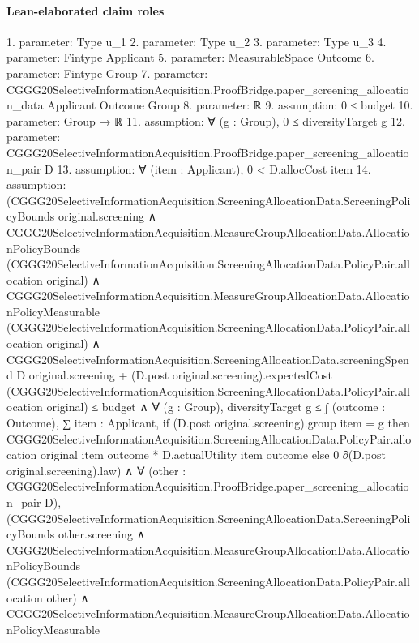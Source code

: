 \documentclass[10pt]{article}
\begin{document}
\paragraph{Lean-elaborated claim roles}\begin{ReviewVerbatim}
1. parameter: Type u_1
2. parameter: Type u_2
3. parameter: Type u_3
4. parameter: Fintype Applicant
5. parameter: MeasurableSpace Outcome
6. parameter: Fintype Group
7. parameter: CGGG20SelectiveInformationAcquisition.ProofBridge.paper_screening_allocation_data Applicant Outcome Group
8. parameter: ℝ
9. assumption: 0 ≤ budget
10. parameter: Group → ℝ
11. assumption: ∀ (g : Group), 0 ≤ diversityTarget g
12. parameter: CGGG20SelectiveInformationAcquisition.ProofBridge.paper_screening_allocation_pair D
13. assumption: ∀ (item : Applicant), 0 < D.allocCost item
14. assumption: (CGGG20SelectiveInformationAcquisition.ScreeningAllocationData.ScreeningPolicyBounds original.screening ∧
    CGGG20SelectiveInformationAcquisition.MeasureGroupAllocationData.AllocationPolicyBounds
        (CGGG20SelectiveInformationAcquisition.ScreeningAllocationData.PolicyPair.allocation original) ∧
      CGGG20SelectiveInformationAcquisition.MeasureGroupAllocationData.AllocationPolicyMeasurable
          (CGGG20SelectiveInformationAcquisition.ScreeningAllocationData.PolicyPair.allocation original) ∧
        CGGG20SelectiveInformationAcquisition.ScreeningAllocationData.screeningSpend D original.screening +
              (D.post original.screening).expectedCost
                (CGGG20SelectiveInformationAcquisition.ScreeningAllocationData.PolicyPair.allocation original) ≤
            budget ∧
          ∀ (g : Group),
            diversityTarget g ≤
              ∫ (outcome : Outcome),
                ∑ item : Applicant,
                  if (D.post original.screening).group item = g then
                    CGGG20SelectiveInformationAcquisition.ScreeningAllocationData.PolicyPair.allocation original item
                        outcome *
                      D.actualUtility item outcome
                  else 0 ∂(D.post original.screening).law) ∧
  ∀ (other : CGGG20SelectiveInformationAcquisition.ProofBridge.paper_screening_allocation_pair D),
    (CGGG20SelectiveInformationAcquisition.ScreeningAllocationData.ScreeningPolicyBounds other.screening ∧
        CGGG20SelectiveInformationAcquisition.MeasureGroupAllocationData.AllocationPolicyBounds
            (CGGG20SelectiveInformationAcquisition.ScreeningAllocationData.PolicyPair.allocation other) ∧
          CGGG20SelectiveInformationAcquisition.MeasureGroupAllocationData.AllocationPolicyMeasurable

\end{ReviewVerbatim}
\end{document}
